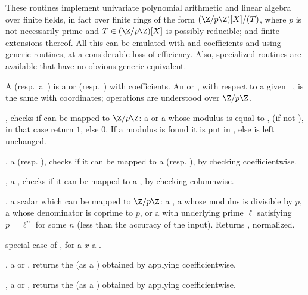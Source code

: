 \noindent These routines implement univariate polynomial arithmetic and
linear algebra over finite fields, in fact over finite rings of the form
$(\Z/p\Z)[X]/(T)$, where $p$ is not necessarily prime and $T\in(\Z/p\Z)[X]$ is
possibly reducible; and finite extensions thereof. All this can be emulated
with  and  coefficients and using generic routines,
at a considerable loss of efficiency. Also, specialized routines are
available that have no obvious generic equivalent.

 A 
(resp.~a~) is a  or  (resp.~) with
 coefficients. An  or , with respect to a given
~, is the same with  coordinates; operations are
understood over $\Z/p\Z$.


, checks if  can be mapped to
$\Z/p\Z$: a  or a  whose modulus is equal to ,
(if  not ), in that case return $1$, else $0$. If a modulus
is found it is put in , else  is left unchanged.

,  a  (resp. ),
checks if it can be mapped to a  (resp. ), by checking
 coefficientwise.

,  a ,
checks if it can be mapped to a , by checking 
columnwise.

,  a scalar which can be mapped to
$\Z/p\Z$: a , a  whose modulus is divisible by $p$,
a  whose denominator is coprime to $p$, or a  with
underlying prime $\ell$ satisfying $p = \ell^n$ for some $n$ (less than the
accuracy of the input). Returns , normalized.

 special case of ,
for a $x$ a .

,  a  or ,
returns the  (as a ) obtained by applying 
coefficientwise.

,  a  or ,
returns the  (as a ) obtained by applying 
coefficientwise.

